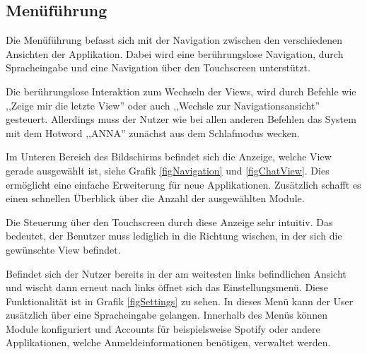 \subsection{Menüführung}
Die Menüführung befasst sich mit der Navigation zwischen den verschiedenen Ansichten der Applikation. Dabei wird eine berührungslose Navigation, durch Spracheingabe und eine Navigation über den Touchscreen unterstützt.

Die berührungslose Interaktion zum Wechseln der Views, wird durch Befehle wie ,,Zeige mir die letzte View'' oder auch ,,Wechsle zur Navigationsansicht'' gesteuert. Allerdings muss der Nutzer wie bei allen anderen Befehlen das System mit dem Hotword ,,ANNA'' zunächst aus dem Schlafmodus wecken.

Im Unteren Bereich des Bildschirms befindet sich die Anzeige, welche View gerade ausgewählt ist, siehe Grafik \ref{figNavigation} und \ref{figChatView}. Dies ermöglicht eine einfache Erweiterung für neue Applikationen. Zusätzlich schafft es einen schnellen Überblick über die Anzahl der ausgewählten Module.  

Die Steuerung über den Touchscreen durch diese Anzeige sehr intuitiv. Das bedeutet, der Benutzer muss lediglich in die Richtung wischen, in der sich die gewünschte View befindet.

Befindet sich der Nutzer bereits in der am weitesten links befindlichen Ansicht und wischt dann erneut nach links öffnet sich das Einstellungsmenü. Diese Funktionalität ist in Grafik \ref{figSettings} zu sehen. In dieses Menü kann der User zusätzlich über eine Spracheingabe gelangen. Innerhalb des Menüs können Module konfiguriert und Accounts für beispielsweise Spotify oder andere Applikationen, welche Anmeldeinformationen benötigen, verwaltet werden.

